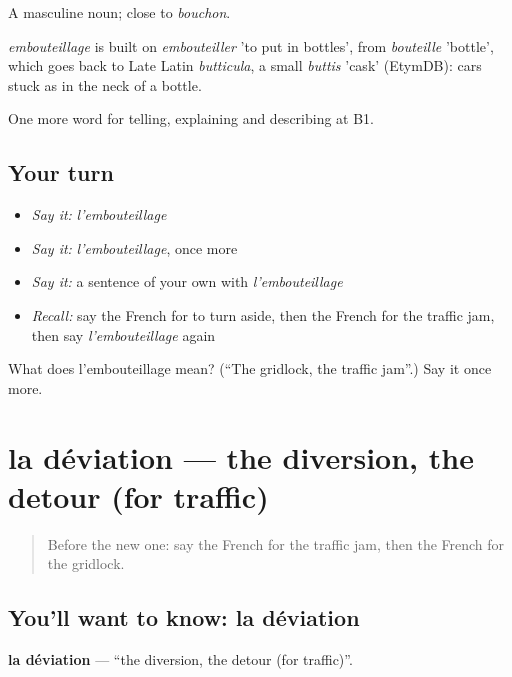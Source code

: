 A masculine noun; close to \emph{bouchon}.

\begin{cousinweb}
\emph{embouteillage} is built on \emph{embouteiller} 'to put in bottles', from \emph{bouteille} 'bottle', which goes back to Late Latin \emph{butticula}, a small \emph{buttis} 'cask' (EtymDB): cars stuck as in the neck of a bottle.
\end{cousinweb}

\begin{grammarlens}[title={What you've built}]
One more word for telling, explaining and describing at B1.
\end{grammarlens}

\subsection*{Your turn}
\begin{itemize}
\raggedright
  \item \emph{Say it:} \emph{l'embouteillage}
  \item \emph{Say it:} \emph{l'embouteillage}, once more
  \item \emph{Say it:} a sentence of your own with \emph{l'embouteillage}
  \item \emph{Recall:} say the French for to turn aside, then the French for the traffic jam, then say \emph{l'embouteillage} again
\end{itemize}

\begin{tcolorbox}[breakable,colback=teal!4,colframe=teal!35!black,title={Before you move on}]
What does l'embouteillage mean? (\textquotedblleft{}The gridlock, the traffic jam\textquotedblright{}.) Say it once more.
\end{tcolorbox}
\section[la déviation]{la déviation — the diversion, the detour (for traffic)}

\label{lesson:FR-C410-deviation}



\begin{quote}
Before the new one: say the French for the traffic jam, then the French for the gridlock.
\end{quote}

\subsection*{You'll want to know: la déviation}
\textbf{la déviation} — \textquotedblleft{}the diversion, the detour (for traffic)\textquotedblright{}.

